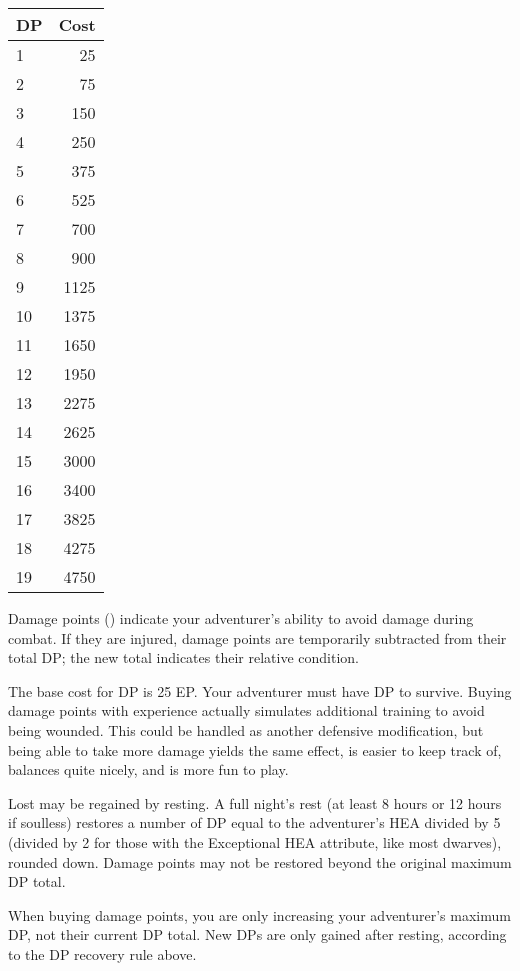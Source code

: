 \begin{normbox}[Buying DP]
\small
\begin{tabular}{@{}l r}
\textbf{DP} & \textbf{Cost}\\
\midrule
1 & 25\\
2 & 75\\
3 & 150\\
4 & 250\\
5 & 375\\
6 & 525\\
7 & 700\\
8 & 900\\
9 & 1125\\
10 & 1375\\
11 & 1650\\
12 & 1950\\
13 & 2275\\
14 & 2625\\
15 & 3000\\
16 & 3400\\
17 & 3825\\
18 & 4275\\
19 & 4750\\
\end{tabular}
\end{normbox}

Damage points (\DP) indicate your adventurer's ability to avoid damage during combat.  If they are injured, damage points are temporarily subtracted from their total DP; the new total indicates their relative condition.

The base cost for DP is 25 EP. Your adventurer must have DP to survive. Buying damage points with experience actually simulates additional training to avoid being wounded. This could be handled as another defensive modification, but being able to take more damage yields the same effect, is easier to keep track of, balances quite nicely, and is more fun to play.

Lost \DP may be regained by resting. A full night's rest (at least 8 hours or 12 hours if soulless) restores a number of DP equal to the adventurer's HEA divided by 5 (divided by 2 for those with the Exceptional HEA attribute, like most dwarves), rounded down. Damage points may not be restored beyond the original maximum DP total.

When buying damage points, you are only increasing your adventurer's maximum DP, not their current DP total. New DPs are only gained after resting, according to the DP recovery rule above.

